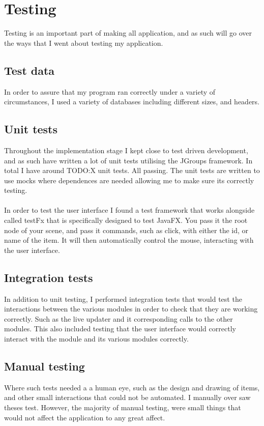 \section{Testing}
\label{sec:testing}

Testing is an important part of making all application, and as such will go over the ways that I went about testing my application.

\subsection{Test data}
\label{subsec:test_data}

In order to assure that my program ran correctly under a variety of circumstances, I used a variety of databases including different sizes, and headers. 

\subsection{Unit tests}
\label{subsec:unit_tests}

Throughout the implementation stage I kept close to test driven development, and as such have written a lot of unit tests utilising the JGroups framework. In total I have around TODO:X unit tests. All passing. The unit tests are written to use mocks where dependences are needed allowing me to make sure its correctly testing.
\\\\
In order to test the user interface I found a test framework that works alongside called testFx that is specifically designed to test JavaFX. You pass it the root node of your scene, and pass it commands, such as click, with either the id, or name of the item. It will then automatically control the mouse, interacting with the user interface.

\subsection{Integration tests}
\label{subsec:integration_tests}

In addition to unit testing, I performed integration tests that would test the interactions between the various modules in order to check that they are working correctly. Such as the live updater and it corresponding calls to the other modules. This also included testing that the user interface would correctly interact with the module and its various modules correctly.

\subsection{Manual testing}
\label{subsec:mamual_tests}

Where such tests needed a a human eye, such as the design and drawing of items, and other small interactions that could not be automated. I manually over saw theses test. However, the majority of manual testing, were small things that would not affect the application to any great affect.